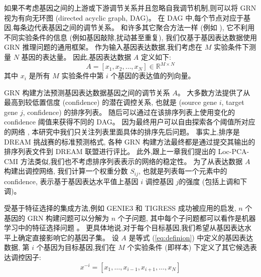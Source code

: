 如果不考虑基因之间的上游或下游调节关系并且忽略自我调节机制,则可以将 GRN 视为有向无环图 (directed acyclic graph, DAG)。
在 DAG 中,每个节点对应于基因,每条边代表基因之间的调节关系。
和许多其它聚合方法一样 (例如 \cite{huynh2010inferring,Haury2012,slawek2013ennet,ruyssinck2014nimefi,guo2016gene,zheng2019ensemble}),
它不利用不同实验条件的信息 (例如基因敲除,扰动甚至重复),
我们仅基于基因表达数据使用 GRN 推理问题的通用框架。
作为输入基因表达数据,我们考虑在 $M$ 实验条件下测量 $N$ 基因的表达量。
因此,基因表达数据 $A$ 定义如下:
\begin{equation}
\label{eq:definion}
A = [x_1,x_2,\ldots,x_N] \in \mathbb{R} ^ {M \times N}
\end{equation}
其中 $x_i$ 是所有 $M$ 实验条件中第 $i$ 个基因的表达值的列向量。

GRN 构建方法预测基因表达数据基因之间的调节关系 $A$。
大多数方法提供了从最高到较低置信度 (confidence) 的潜在调控关系,
也就是 (source gene $i$, target gene $j$, confidence) 的排序列表。
随后可以通过在该排序列表上使用变化的 confidence 阈值来获得不同的 DAG。
因为最终用户可以自由探索各个阈值所对应的网络 \cite{slawek2013ennet},
本研究中我们只关注列表里面具体的排序先后问题。
事实上,排序是 DREAM \cite{stolovitzky2007dialogue} 挑战赛的标准预测格式,
各种 GRN 构建方法最终都是通过提交其输出的排序列表文件到 DREAM 联盟进行评比。
此外,跟上一章我们提出的 Loc-PCA-CMI 方法类似,我们也不考虑排序列表表示的网络的稳定性。
为了从表达数据 $A$ 构建出调控网络,
我们计算一个权重分数 $S_{ij}$, 也就是列表每一个元素中的 confidence,
表示基于基因表达水平值上基因 $i$ 调控基因 $j$的强度 (包括上调和下调)。


受基于特征选择的集成方法,例如 GENIE3 \cite{huynh2010inferring} 和 TIGRESS \cite{Haury2012} 成功被应用的启发,
$n$ 个基因的 GRN 构建问题可以分解为 $n$ 个子问题,
其中每个子问题都可以看作是机器学习中的特征选择问题 \cite{nasrabadi2007pattern}。
更具体地说,对于每个目标基因,我们希望从基因表达水平上确定直接影响它的基因子集。
设 $A$ 是等式 (\ref{eq:definion}) 中定义的基因表达数据,
第 $i$ 个基因为目标基因,我们在 $M$ 个实验条件 (即样本) 下定义了其它候选表达调控因子:
\begin{equation}
  \label{eq:x}
  x^{-i} = [x_1,\ldots,x_{i-1},x_{i+1},\ldots,x_N]
  \end{equation}

